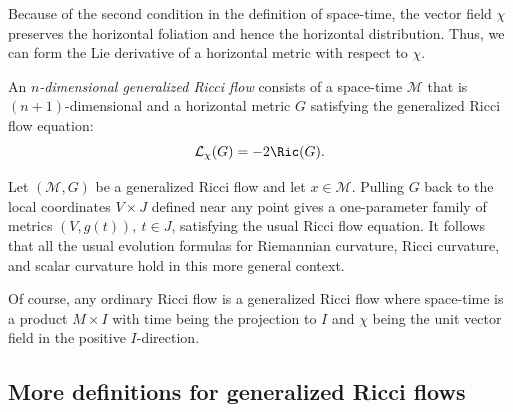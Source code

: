 Because of the second condition in the definition of space-time, the
vector field $\chi$ preserves the horizontal foliation and hence the
horizontal distribution. Thus, we can form the Lie derivative of a
horizontal metric with respect to $\chi$.

\begin{definition}\label{def:generalized-ricci-flow}
An {\em $n$-dimensional generalized Ricci flow} consists of a space-time ${\mathcal M}$ that is
$(n+1)$-dimensional and a horizontal metric $G$ satisfying the
generalized Ricci flow equation:
$${\mathcal L}_\chi(G)=-2\Ric(G).$$
\end{definition}


\begin{remark}\label{rem:generalized-ricci-flow-local}

Let $({\mathcal M},G)$ be a generalized Ricci flow and let $x\in
{\mathcal M}$. Pulling $G$ back to  the local coordinates $V\times
J$ defined near any point gives a one-parameter family of metrics
$(V,g(t)),\  t\in J$, satisfying the usual Ricci flow equation. It
follows that all the usual evolution formulas for Riemannian
curvature, Ricci curvature, and scalar curvature hold in this more
general context.
\end{remark}

Of course, any ordinary Ricci flow is a generalized Ricci flow where
space-time is a product $M\times I$ with time being the projection
to $I$ and $\chi$ being the unit vector field in the positive
$I$-direction.


\subsection{More definitions for generalized Ricci flows}

